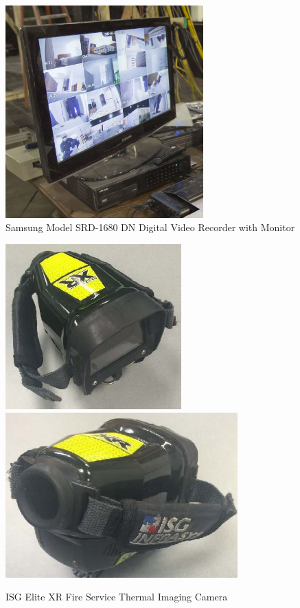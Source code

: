 \documentclass[12pt,oneside]{book}
\begin{document}
\begin{figure}[H]
	\centering
	\includegraphics[width = 3in]{0_Images/Instrumentation/DVR.jpg}

	\caption{Samsung Model SRD-1680 DN Digital Video Recorder with Monitor}
	\label{fig:DVR}
\end{figure}

\begin{figure}[H]
	\centering
	\includegraphics[height = 2.5in]{0_Images/Instrumentation/ISG_IR.jpg}
	\includegraphics[height = 2.5in]{0_Images/Instrumentation/ISG_IR2.jpg}
	\caption{ISG Elite XR Fire Service Thermal Imaging Camera}
	\label{fig:IRCam}
\end{figure}
\end{document}
